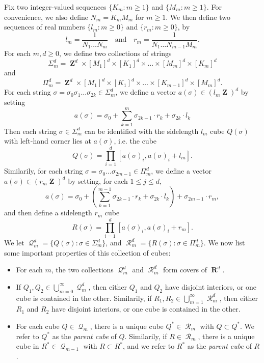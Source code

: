 \documentclass[12pt,reqno]{article}
\numberwithin{equation}{section}
\DeclareMathOperator{\RR}{\mathbf{R}}
\DeclareMathOperator{\ZZ}{\mathbf{Z}}
\DeclareMathOperator{\DQ}{\mathcal{Q}}
\DeclareMathOperator{\DR}{\mathcal{R}}
\begin{document}
Fix two integer-valued sequences $\{ K_m : m \geq 1 \}$ and $\{ M_m : m \geq 1 \}$. For convenience, we also define $N_m = K_m M_m$ for $m \geq 1$. We then define two sequences of real numbers $\{ l_m : m \geq 0 \}$ and $\{ r_m : m \geq 0 \}$, by
%
\[ l_m = \frac{1}{N_1 \dots N_m} \quad\text{and}\quad r_m = \frac{1}{N_1 \dots N_{m-1} M_m}. \]
%
For each $m, d \geq 0$, we define two collections of strings
%
\[ \Sigma_m^d = \ZZ^d \times [M_1]^d \times [K_1]^d \times \dots \times [M_m]^d \times [K_m]^d \]
%
and
%
\[ \Pi_m^d = \ZZ^d \times [M_1]^d \times [K_1]^d \times \dots \times [K_{m-1}]^d \times [M_m]^d. \]
%
For each string $\sigma = \sigma_0 \sigma_1 \dots \sigma_{2k} \in \Sigma_m^d$, we define a vector $a(\sigma) \in (l_m \ZZ)^d$ by setting
%
\[ a(\sigma) = \sigma_0 + \sum_{k = 1}^m \sigma_{2k-1} \cdot r_k + \sigma_{2k} \cdot l_k \]
%
Then each string $\sigma \in \Sigma_m^d$ can be identified with the sidelength $l_m$ cube $Q(\sigma)$ with left-hand corner lies at $a(\sigma)$, i.e. the cube
%
\[ Q(\sigma) = \prod_{i = 1}^d \left[ a(\sigma)_i, a(\sigma)_i + l_m \right]. \]
%
Similarily, for each string $\sigma = \sigma_0 \dots \sigma_{2m-1} \in \Pi_m^d$, we define a vector $a(\sigma) \in (r_m \ZZ)^d$ by setting, for each $1 \leq j \leq d$,
%
\[ a(\sigma) = \sigma_0 + \left( \sum_{k = 1}^{m-1} \sigma_{2k-1} \cdot r_k + \sigma_{2k} \cdot l_k \right) + \sigma_{2m-1} \cdot r_m, \]
%
and then define a sidelength $r_m$ cube
%
\[ R(\sigma) = \prod_{i = 1}^d \left[ a(\sigma)_i, a(\sigma)_i + r_m \right]. \]
%
We let $\DQ_m^d = \{ Q(\sigma) : \sigma \in \Sigma_m^d \}$, and $\DR_m^d = \{ R(\sigma) : \sigma \in \Pi_m^d \}$. We now list some important properties of this collection of cubes:
%
\begin{itemize}
	\item For each $m$, the two collections $\DQ_m^d$ and $\DR_m^d$ form covers of $\RR^d$.

	\item If $Q_1,Q_2 \in \bigcup_{m = 0}^\infty \DQ_m^d$, then either $Q_1$ and $Q_2$ have disjoint interiors, or one cube is contained in the other. Similarily, if $R_1,R_2 \in \bigcup_{m = 1}^\infty \DR_m^d$, then either $R_1$ and $R_2$ have disjoint interiors, or one cube is contained in the other.

	\item For each cube $Q \in \DQ_m$, there is a unique cube $Q^* \in \DR_m$ with $Q \subset Q^*$. We refer to $Q^*$ as the \emph{parent cube} of $Q$. Similarily, if $R \in \DR_m$, there is a unique cube in $R^* \in \DQ_{m-1}$ with $R \subset R^*$, and we refer to $R^*$ as the \emph{parent cube} of $R$.
\end{itemize}
\end{document}
